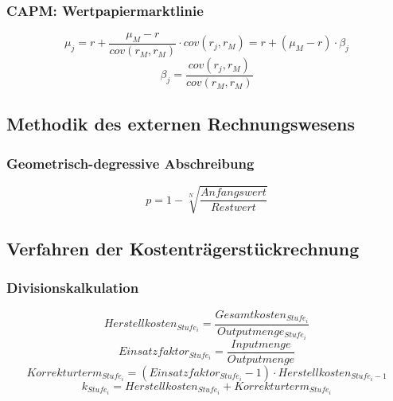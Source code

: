 \subsubsection{CAPM: Wertpapiermarktlinie}
\[\mu_j = r + \frac{\mu_M-r}{cov(r_M,r_M)}\cdot cov(r_j,r_M) = r + (\mu_M-r)\cdot \beta_j\]
\[\beta_j = \frac{cov(r_j,r_M)}{cov(r_M,r_M)}\]


\subsection{Methodik des externen Rechnungswesens}

\subsubsection{Geometrisch-degressive Abschreibung}
\[p = 1 - \sqrt[N]{\frac{Anfangswert}{Restwert}}\]


\subsection{Verfahren der Kostenträgerstückrechnung}

\subsubsection{Divisionskalkulation}
\[Herstellkosten_{Stufe_i} = \frac{Gesamtkosten_{Stufe_i}}{Outputmenge_{Stufe_i}}\]
\[Einsatzfaktor_{Stufe_i}=\frac{Inputmenge}{Outputmenge}\]
\[Korrekturterm_{Stufe_i} = (Einsatzfaktor_{Stufe_i}-1)\cdot Herstellkosten_{Stufe_i-1}\]
\[k_{Stufe_i} = Herstellkosten_{Stufe_i}+Korrekturterm_{Stufe_i}\]

